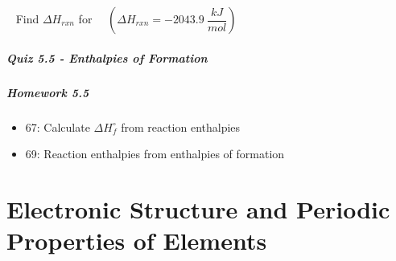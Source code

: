 \documentclass[12pt, openany, letterpaper]{memoir}
\begin{document}
\begin{itemize}
\begin{itemize}
        ~\hphantom{Practice:} Find $\Delta H_{rxn}$ for~~  \hspace{1em} $\left(\Delta H_{rxn}=-2043.9~\dfrac{kJ}{mol}\right)$
    \end{itemize}
\end{itemize}

\paragraph*{Quiz 5.5 - Enthalpies of Formation}
\paragraph*{Homework 5.5}
\begin{itemize}
  \item 67: Calculate $\Delta H_f^\circ$ from reaction enthalpies
  \item 69: Reaction enthalpies from enthalpies of formation
\end{itemize}

\chapter{Electronic Structure and Periodic Properties of Elements}
\end{document}
